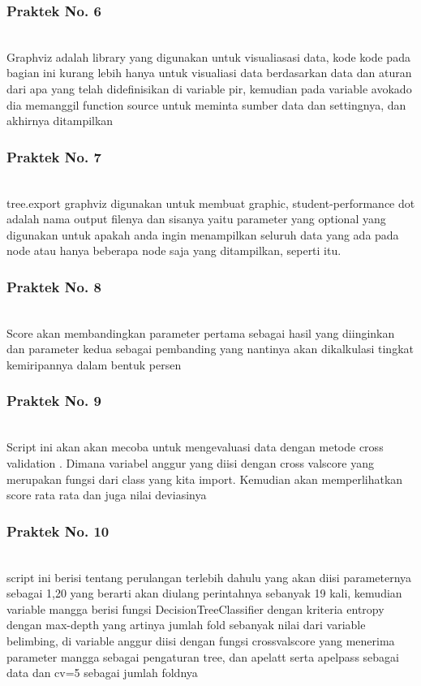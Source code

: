 \subsubsection{Praktek No. 6}
\hfill\\
 
Graphviz adalah library yang digunakan untuk visualiasasi data, kode kode pada bagian ini kurang lebih hanya untuk visualiasi data berdasarkan data dan aturan dari apa yang telah didefinisikan di variable pir, kemudian pada variable avokado dia memanggil function source untuk meminta sumber data dan settingnya, dan akhirnya ditampilkan

\subsubsection{Praktek No. 7}
\hfill\\
 
tree.export graphviz digunakan untuk membuat  graphic, student-performance dot adalah nama output filenya dan sisanya yaitu parameter yang optional yang digunakan untuk apakah anda ingin menampilkan seluruh data yang ada pada node atau hanya beberapa node saja yang ditampilkan, seperti itu.

\subsubsection{Praktek No. 8}
\hfill\\
 
Score akan membandingkan parameter pertama sebagai hasil yang diinginkan dan parameter kedua sebagai pembanding yang nantinya akan dikalkulasi tingkat kemiripannya dalam bentuk persen

\subsubsection{Praktek No. 9}
\hfill\\
 
Script ini akan akan mecoba untuk mengevaluasi data dengan metode cross validation . Dimana variabel anggur yang  diisi  dengan cross valscore yang merupakan fungsi dari class yang kita import. Kemudian akan memperlihatkan score rata rata dan juga nilai deviasinya

\subsubsection{Praktek No. 10}
\hfill\\
 
script ini berisi tentang perulangan terlebih dahulu yang akan diisi parameternya sebagai 1,20 yang berarti akan diulang perintahnya sebanyak 19 kali, kemudian variable mangga berisi fungsi DecisionTreeClassifier dengan kriteria entropy dengan max-depth yang artinya jumlah fold sebanyak nilai dari variable belimbing, di variable anggur diisi dengan fungsi crossvalscore yang menerima parameter mangga sebagai pengaturan tree, dan apelatt serta apelpass sebagai data dan cv=5 sebagai jumlah foldnya


